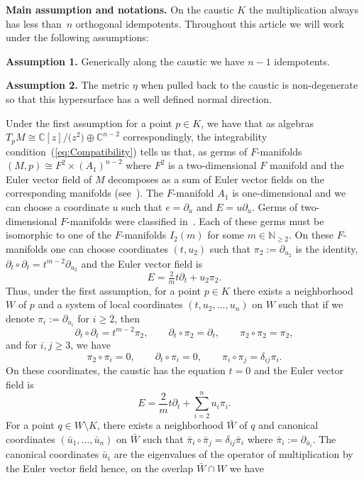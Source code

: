 \documentclass[10pt,a4paper]{amsart}
\numberwithin{equation}{section}
\begin{document}
\textbf{Main assumption and notations.} On the caustic $K$ the multiplication always has less than~$n$ orthogonal idempotents. Throughout this article we will work under the following assumptions:

\textbf{Assumption 1.} Generically along the caustic we have $n-1$ idempotents.

\textbf{Assumption 2.} The metric $\eta$ when pulled back to the caustic is non-degenerate so that this hypersurface has a well defined normal direction.

Under the first assumption for a point $p\in K$, we have that as algebras $T_{p}M\cong \mathbb{C}[z]/\bigl(z^{2}\bigr)\oplus\mathbb{C}^{n-2}$ correspondingly, the integrability condition~(\ref{eq:Compatibility}) tells us that, as germs of $F$-manifolds $(M,p)\cong F^{2}\times (A_{1})^{n-2}$ where $F^{2}$ is a two-dimensional $F$ manifold and the Euler vector field of $M$ decomposes as a sum of Euler vector fields on the corresponding manifolds (see~\cite[Theorem~2.11]{HertlingFrobenius}). The $F$-manifold $A_{1}$ is one-dimensional and we can choose a coordinate $u$ such that $e=\partial_{u}$ and $E=u\partial_{u}$. Germs of two-dimensional $F$-manifolds were classified in~\cite[Theorem~4.7]{HertlingFrobenius}. Each of these germs must be isomorphic to one of the $F$-manifolds $I_{2}(m)$ for some $m\in\mathbb{N}_{\geq 2}$. On these $F$-manifolds one can choose coordinates $(t,u_{2})$ such that $\pi_{2}:=\partial_{u_{2}}$ is the identity, $\partial_{t}\circ\partial_{t}=t^{m-2}\partial_{u_{2}}$ and the Euler vector field is
\begin{equation*}
 E=\tfrac{2}{m}t\partial_{t}+u_{2}\pi_{2}.
\end{equation*}
\indent Thus, under the first assumption, for a point $p\in K$ there exists a neighborhood $W$ of $p$ and a system of local coordinates $(t,u_{2},\dots,u_{n})$ on $W$ such that if we denote $\pi_{i}:=\partial_{u_{i}}$ for $i\geq 2$, then
\[
 \partial_{t}\circ\partial_{t}=t^{m-2}\pi_{2},\qquad
 \partial_{t}\circ\pi_{2}=\partial_{t},\qquad
 \pi_{2}\circ\pi_{2}=\pi_{2},
\]
and for $i,j\geq3$, we have
\[
 \pi_{2}\circ\pi_{i}=0,\qquad
 \partial_{t}\circ\pi_{i}=0,\qquad
 \pi_{i}\circ\pi_{j}=\delta_{ij}\pi_{i}.
\]
 On these coordinates, the caustic has the equation $t=0$ and the Euler vector field is
 \begin{equation*}
 E=\frac{2}{m}t\partial_{t}+\sum_{i=2}^{n}u_{i}\pi_{i}.
 \end{equation*}
 For a point $q\in W\setminus K$, there exists a neighborhood $\bar{W}$ of $q$ and canonical coordinates $(\bar{u}_{1},\dots,\bar{u}_{n})$ on $\bar{W}$ such that $\bar{\pi}_{i}\circ\bar{\pi}_{j}=\delta_{ij}\bar{\pi}_{i}$ where $\bar{\pi}_{i}:=\partial_{\bar{u}_{i}}$. The canonical coordinates $\bar{u}_{i}$ are the eigenvalues of the operator of multiplication by the Euler vector field hence, on the overlap $\bar{W}\cap W$ we have%
\end{document}
